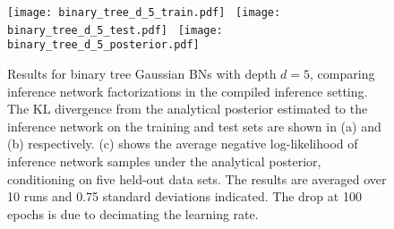 \begin{figure}[t]
  \centering
  \subcaptionbox{\label{fig:binary-tree-kl-train}}%
  {\texttt{[image: binary\_tree\_d\_5\_train.pdf]}}%
  \,%
  \subcaptionbox{\label{fig:binary-tree-kl-test}}%
  {\texttt{[image: binary\_tree\_d\_5\_test.pdf]}}%
  \,%
  \subcaptionbox{\label{fig:binary-tree-kl-posterior}}%
  {\texttt{[image: binary\_tree\_d\_5\_posterior.pdf]}}%
  \vspace{-1ex}
  \caption[Results for binary trees]{
    Results for binary tree Gaussian BNs with depth $d=5$, comparing inference network factorizations in the compiled inference setting.
    The KL divergence from the analytical posterior estimated to the inference network on the training and test sets are shown
    in (a) and (b) respectively.
    (c) shows the average negative log-likelihood of inference network samples under the analytical posterior, conditioning on five held-out data sets.
    The results are averaged over 10 runs and 0.75 standard deviations indicated.
		The drop at 100 epochs is due to decimating the learning rate.}
 \vspace{-2.5ex}
  \label{fig:binary-tree-kl}
\end{figure}

